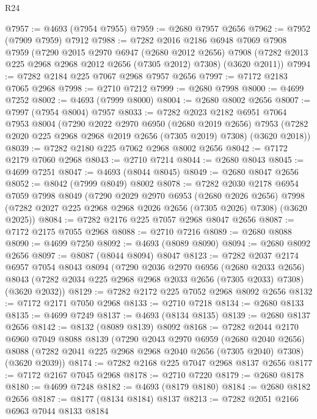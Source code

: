 \begin{lexlean}{R24}
\begin{coremodule}
@7957 := @4693 (@7954 @7955)
@7959 := @2680 @7957 @2656
@7962 := @7952 (@7909 @7959) @7912
@7988 := @7282
    @2016
    @2186
    @6948
    @7069
    @7908
    @7959
    (@7290
      @2015
      @2970
      @6947
      (@2680 @2012 @2656)
      @7908
      (@7282 @2013 @225 @2968 @2968 @2012 @2656 (@7305 @2012) @7308)
      (@3620 @2011))
@7994 := @7282 @2184 @225 @7067 @2968 @7957 @2656
@7997 := @7172 @2183 @7065 @2968
@7998 := @2710 @7212
@7999 := @2680 @7998
@8000 := @4699 @7252
@8002 := @4693 (@7999 @8000)
@8004 := @2680 @8002 @2656
@8007 := @7997 (@7954 @8004) @7957
@8033 := @7282
    @2023
    @2182
    @6951
    @7064
    @7953
    @8004
    (@7290
      @2022
      @2970
      @6950
      (@2680 @2019 @2656)
      @7953
      (@7282 @2020 @225 @2968 @2968 @2019 @2656 (@7305 @2019) @7308)
      (@3620 @2018))
@8039 := @7282 @2180 @225 @7062 @2968 @8002 @2656
@8042 := @7172 @2179 @7060 @2968
@8043 := @2710 @7214
@8044 := @2680 @8043
@8045 := @4699 @7251
@8047 := @4693 (@8044 @8045)
@8049 := @2680 @8047 @2656
@8052 := @8042 (@7999 @8049) @8002
@8078 := @7282
    @2030
    @2178
    @6954
    @7059
    @7998
    @8049
    (@7290
      @2029
      @2970
      @6953
      (@2680 @2026 @2656)
      @7998
      (@7282 @2027 @225 @2968 @2968 @2026 @2656 (@7305 @2026) @7308)
      (@3620 @2025))
@8084 := @7282 @2176 @225 @7057 @2968 @8047 @2656
@8087 := @7172 @2175 @7055 @2968
@8088 := @2710 @7216
@8089 := @2680 @8088
@8090 := @4699 @7250
@8092 := @4693 (@8089 @8090)
@8094 := @2680 @8092 @2656
@8097 := @8087 (@8044 @8094) @8047
@8123 := @7282
    @2037
    @2174
    @6957
    @7054
    @8043
    @8094
    (@7290
      @2036
      @2970
      @6956
      (@2680 @2033 @2656)
      @8043
      (@7282 @2034 @225 @2968 @2968 @2033 @2656 (@7305 @2033) @7308)
      (@3620 @2032))
@8129 := @7282 @2172 @225 @7052 @2968 @8092 @2656
@8132 := @7172 @2171 @7050 @2968
@8133 := @2710 @7218
@8134 := @2680 @8133
@8135 := @4699 @7249
@8137 := @4693 (@8134 @8135)
@8139 := @2680 @8137 @2656
@8142 := @8132 (@8089 @8139) @8092
@8168 := @7282
    @2044
    @2170
    @6960
    @7049
    @8088
    @8139
    (@7290
      @2043
      @2970
      @6959
      (@2680 @2040 @2656)
      @8088
      (@7282 @2041 @225 @2968 @2968 @2040 @2656 (@7305 @2040) @7308)
      (@3620 @2039))
@8174 := @7282 @2168 @225 @7047 @2968 @8137 @2656
@8177 := @7172 @2167 @7045 @2968
@8178 := @2710 @7220
@8179 := @2680 @8178
@8180 := @4699 @7248
@8182 := @4693 (@8179 @8180)
@8184 := @2680 @8182 @2656
@8187 := @8177 (@8134 @8184) @8137
@8213 := @7282
    @2051
    @2166
    @6963
    @7044
    @8133
    @8184

\end{coremodule}
\end{lexlean}
